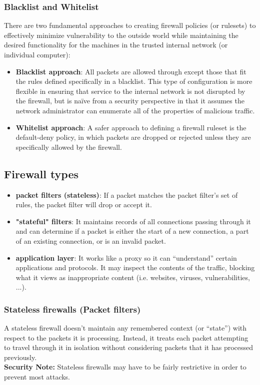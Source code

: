 \subsubsection{Blacklist and Whitelist}
There are two fundamental approaches to creating firewall policies (or rulesets) to effectively minimize vulnerability to the outside world while maintaining the desired functionality for the machines in the trusted
internal network (or individual computer):
\begin{itemize}
\item \textbf{Blacklist approach}: All packets are allowed through except those that fit the rules defined
specifically in a blacklist. This type of configuration is more flexible in ensuring that service to the internal network is not disrupted by the firewall, but is naïve from a security perspective in that it assumes the network administrator can enumerate all of the properties of malicious traffic.
\item \textbf{Whitelist approach}: A safer approach to defining a firewall ruleset is the default-deny policy, in which packets are dropped or rejected unless they are specifically allowed by the firewall.
\end{itemize}
\subsection{Firewall types}
\begin{itemize}
\item \textbf{packet filters (stateless)}: If a packet matches the packet filter's set of rules, the packet filter will drop or accept it. 
\item \textbf{"stateful" filters}: It maintains records of all connections passing through it and can determine if a packet is either the start of a new connection, a part of an existing connection, or is an invalid packet.
\item \textbf{application layer}: It works like a proxy so it can “understand” certain applications and protocols. It may inspect the contents of the traffic, blocking what it views as inappropriate content (i.e. websites, viruses, vulnerabilities, ...).
\end{itemize}
\subsubsection{Stateless firewalls (Packet filters)}
A stateless firewall doesn't maintain any remembered context (or “state”) with respect to the packets it is processing. Instead, it treats each packet attempting to travel through it in isolation without considering packets that it has processed previously. \\
\textbf{Security Note:} Stateless firewalls may have to be fairly restrictive in order to prevent most attacks.
